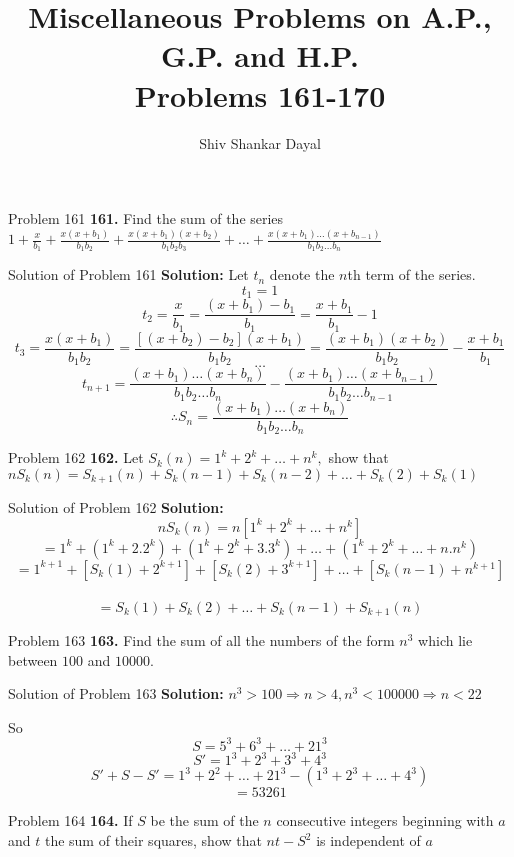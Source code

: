 \documentclass[aspectratio=1610,8pt]{beamer}
\title{Miscellaneous Problems on A.P., G.P. and H.P.\\Problems 161-170}
\author[Shiv Shankar Dayal]{Shiv Shankar Dayal}
\begin{document}
\begin{frame}
  \titlepage
\end{frame}
\begin{frame}{Problem 161}
  \textbf{161.} Find the sum of the series $1 + \frac{x}{b_1} + \frac{x(x + b_1)}{b_1b_2} + \frac{x(x + b_1)(x + b_2)}{b_1b_2b_3} +
  \ldots + \frac{x(x + b_1)\ldots(x + b_{n - 1})}{b_1b_2\ldots b_n}$
\end{frame}
\begin{frame}{Solution of Problem 161}
  \textbf{Solution:} Let $t_n$ denote the $n$th term of the series.
  $$t_1 = 1$$
  $$t_2 = \frac{x}{b_1} = \frac{(x + b_1) - b_1}{b_1} = \frac{x+ b_1}{b_1} - 1$$
  $$t_3 = \frac{x(x + b_1)}{b_1b_2} = \frac{[(x + b_2) - b_2](x + b_1)}{b_1b_2} = \frac{(x + b_1)(x + b_2)}{b_1b_2} - \frac{x +
    b_1}{b_1}$$
  $$\ldots$$
  $$t_{n+1} = \frac{(x + b_1)\ldots (x+b_n)}{b_1b_2\ldots b_n} - \frac{(x+b_1)\ldots(x+b_{n - 1})}{b_1b_2\ldots b_{n - 1}}$$
  $$\therefore S_n = \frac{(x + b_1)\ldots (x+b_n)}{b_1b_2\ldots b_n}$$
\end{frame}
\begin{frame}{Problem 162}
  \textbf{162.} Let $S_k(n) = 1^k + 2^k + \ldots + n^k,$ show that $nS_k(n) = S_{k+1}(n) + S_k(n - 1) + S_k(n - 2) + \ldots +
  S_k(2) + S_k(1)$
\end{frame}
\begin{frame}{Solution of Problem 162}
  \textbf{Solution:} $$nS_k(n) = n[1^k + 2^k + \ldots + n^k]$$
  $$= 1^k + (1^k + 2.2^k) + (1^k + 2^k + 3.3^k) + \ldots + (1^k + 2^k + \ldots + n.n^k)$$
  $$= 1^{k + 1} + [S_k(1) + 2^{k + 1}] + [S_k(2) + 3^{k + 1}] + \ldots + [S_k(n - 1) + n^{k + 1}]$$\
  $$= S_k(1) + S_k(2) + \ldots + S_k(n - 1) + S_{k + 1}(n)$$
\end{frame}
\begin{frame}{Problem 163}
  \textbf{163.} Find the sum of all the numbers of the form $n^3$ which lie between $100$ and $10000.$
\end{frame}
\begin{frame}{Solution of Problem 163}
  \textbf{Solution:} $n^3 > 100 \Rightarrow n > 4, n^3 < 100000 \Rightarrow n < 22$

  So $$S = 5^3 + 6^3 + \ldots + 21^3$$
  $$S' = 1^3 + 2^3 + 3^3 + 4^3$$
  $$S' + S - S' = 1^3 + 2^2 + \ldots + 21^3 - (1^3 + 2^3 + \ldots + 4^3)$$
  $$= 53261$$
\end{frame}
\begin{frame}{Problem 164}
  \textbf{164.} If $S$ be the sum of the $n$ consecutive integers beginning with $a$ and $t$ the sum of their squares, show that
  $nt - S^2$ is independent of $a$
\end{frame}
\end{document}
